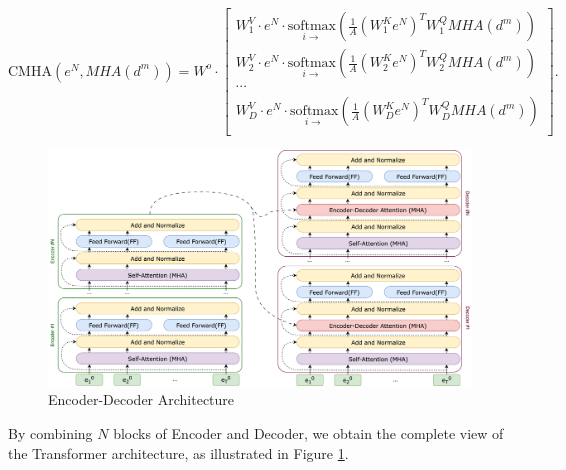 \begin{equation}
    \mathrm{CMHA}(e^N, MHA(d^m)) = W^o \cdot
\begin{bmatrix}
    W^V_1 \cdot e^N \cdot \underset{i \rightarrow}{\mathrm{softmax}}\left( \frac{1}{A} \left(W^K_1 e^N\right)^T W^Q_1 MHA(d^m) \right)\\
    W^V_2 \cdot e^N \cdot \underset{i \rightarrow}{\mathrm{softmax}}\left( \frac{1}{A} \left(W^K_2 e^N\right)^T W^Q_2 MHA(d^m) \right)\\
    \cdots\\
    W^V_D \cdot e^N \cdot \underset{i \rightarrow}{\mathrm{softmax}}\left( \frac{1}{A} \left(W^K_D e^N\right)^T W^Q_D MHA(d^m) \right)\\
\end{bmatrix}\nonumber.
\end{equation}


\begin{figure}[h]
    \centering
    \includegraphics[width=16cm]{pages/imgs/encoder_decoder.png}
    \caption{Encoder-Decoder Architecture}
    \label{fig:encoder_decoder}
\end{figure}


By combining $N$ blocks of Encoder and Decoder, we obtain the complete view of the Transformer architecture, as illustrated in Figure \ref{fig:encoder_decoder}.



